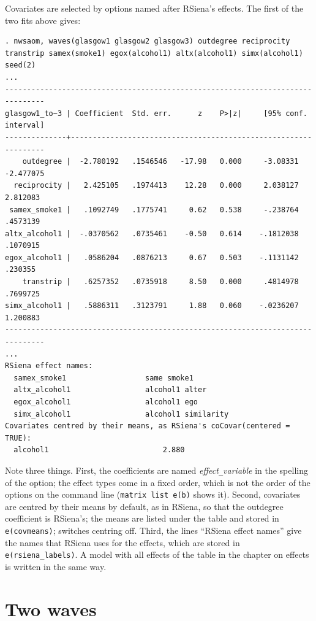 Covariates are selected by options named after RSiena's effects. The first of the two fits above gives:
\begin{lstlisting}
. nwsaom, waves(glasgow1 glasgow2 glasgow3) outdegree reciprocity transtrip samex(smoke1) egox(alcohol1) altx(alcohol1) simx(alcohol1) seed(2)
...
-------------------------------------------------------------------------------
glasgow1_to~3 | Coefficient  Std. err.      z    P>|z|     [95% conf. interval]
--------------+----------------------------------------------------------------
    outdegree |  -2.780192   .1546546   -17.98   0.000     -3.08331   -2.477075
  reciprocity |   2.425105   .1974413    12.28   0.000     2.038127    2.812083
 samex_smoke1 |   .1092749   .1775741     0.62   0.538     -.238764    .4573139
altx_alcohol1 |  -.0370562   .0735461    -0.50   0.614    -.1812038    .1070915
egox_alcohol1 |   .0586204   .0876213     0.67   0.503    -.1131142     .230355
    transtrip |   .6257352   .0735918     8.50   0.000     .4814978    .7699725
simx_alcohol1 |   .5886311   .3123791     1.88   0.060    -.0236207    1.200883
-------------------------------------------------------------------------------
...
RSiena effect names:
  samex_smoke1                  same smoke1
  altx_alcohol1                 alcohol1 alter
  egox_alcohol1                 alcohol1 ego
  simx_alcohol1                 alcohol1 similarity
Covariates centred by their means, as RSiena's coCovar(centered = TRUE):
  alcohol1                          2.880
\end{lstlisting}
Note three things. First, the coefficients are named \emph{effect}\texttt{\_}\emph{variable} in the spelling of the option; the effect types come in a fixed order, which is not the order of the options on the command line (\texttt{matrix list e(b)} shows it). Second, covariates are centred by their means by default, as in RSiena, so that the outdegree coefficient is RSiena's; the means are listed under the table and stored in \texttt{e(covmeans)};  switches centring off. Third, the lines ``RSiena effect names'' give the names that RSiena uses for the effects, which are stored in \texttt{e(rsiena\_labels)}. A model with all effects of the table in the chapter on effects is written in the same way.

\section{Two waves}

